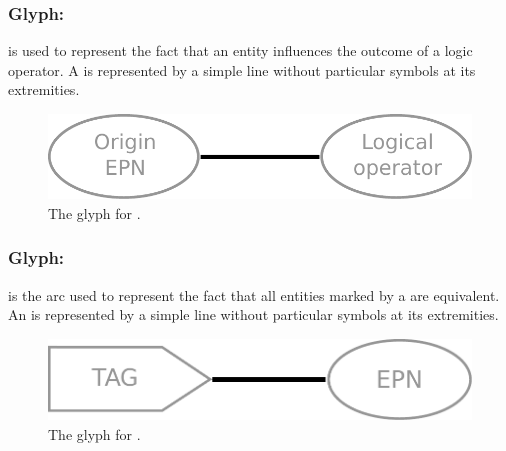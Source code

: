 \subsubsection{Glyph:  }\label{sec:logicArc}

 is used to represent the fact that an entity influences the outcome of a logic operator. A  is represented by a simple line without particular symbols at its extremities.

\begin{figure}[H]
  \centering
  \includegraphics[scale = 0.4]{le_images/logicArc}
  \caption{The \PD glyph for .}
  \label{fig:logicArc}
\end{figure}

\subsubsection{Glyph:  }\label{sec:equivalenceArc}

 is the arc used to represent the fact that all entities
marked by a  are equivalent. An  is represented by a simple line without particular symbols at its extremities.

\begin{figure}[H]
  \centering
  \includegraphics[scale = 0.4]{le_images/equivalence}
  \caption{The \PD glyph for .}
  \label{fig:equivalence}
\end{figure}



